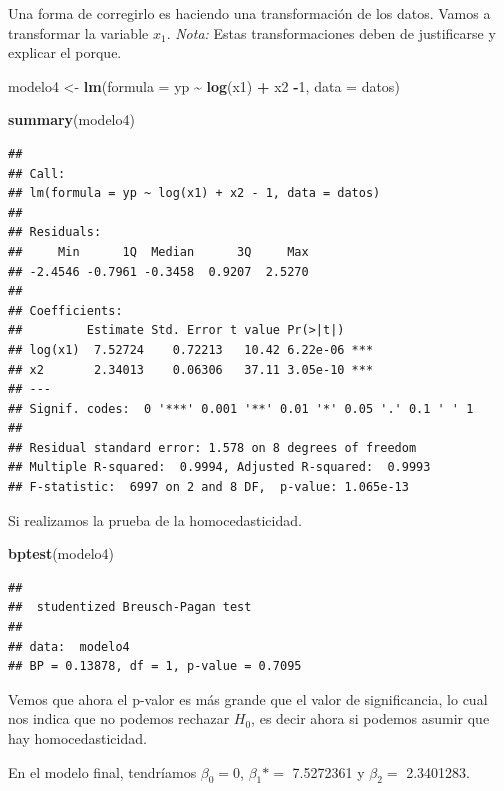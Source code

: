 \documentclass[
]{book}
\newenvironment{Shaded}{\begin{snugshade}}{\end{snugshade}}
\newcommand{\AttributeTok}[1]{\textcolor[rgb]{0.13,0.29,0.53}{#1}}
\newcommand{\DecValTok}[1]{\textcolor[rgb]{0.00,0.00,0.81}{#1}}
\newcommand{\FunctionTok}[1]{\textcolor[rgb]{0.13,0.29,0.53}{\textbf{#1}}}
\newcommand{\NormalTok}[1]{#1}
\newcommand{\OtherTok}[1]{\textcolor[rgb]{0.56,0.35,0.01}{#1}}
\newcommand{\SpecialCharTok}[1]{\textcolor[rgb]{0.81,0.36,0.00}{\textbf{#1}}}
\begin{document}
Una forma de corregirlo es haciendo una transformación de los datos. Vamos a transformar la variable \(x_1\).
\emph{Nota:} Estas transformaciones deben de justificarse y explicar el porque.

\begin{Shaded}
\begin{Highlighting}[]
\NormalTok{modelo4 }\OtherTok{\textless{}{-}} \FunctionTok{lm}\NormalTok{(}\AttributeTok{formula =}\NormalTok{ yp }\SpecialCharTok{\textasciitilde{}} \FunctionTok{log}\NormalTok{(x1) }\SpecialCharTok{+}\NormalTok{ x2 }\SpecialCharTok{{-}}\DecValTok{1}\NormalTok{, }\AttributeTok{data =}\NormalTok{ datos)}

\FunctionTok{summary}\NormalTok{(modelo4)}
\end{Highlighting}
\end{Shaded}

\begin{verbatim}
## 
## Call:
## lm(formula = yp ~ log(x1) + x2 - 1, data = datos)
## 
## Residuals:
##     Min      1Q  Median      3Q     Max 
## -2.4546 -0.7961 -0.3458  0.9207  2.5270 
## 
## Coefficients:
##         Estimate Std. Error t value Pr(>|t|)    
## log(x1)  7.52724    0.72213   10.42 6.22e-06 ***
## x2       2.34013    0.06306   37.11 3.05e-10 ***
## ---
## Signif. codes:  0 '***' 0.001 '**' 0.01 '*' 0.05 '.' 0.1 ' ' 1
## 
## Residual standard error: 1.578 on 8 degrees of freedom
## Multiple R-squared:  0.9994, Adjusted R-squared:  0.9993 
## F-statistic:  6997 on 2 and 8 DF,  p-value: 1.065e-13
\end{verbatim}

Si realizamos la prueba de la homocedasticidad.

\begin{Shaded}
\begin{Highlighting}[]
\FunctionTok{bptest}\NormalTok{(modelo4)}
\end{Highlighting}
\end{Shaded}

\begin{verbatim}
## 
##  studentized Breusch-Pagan test
## 
## data:  modelo4
## BP = 0.13878, df = 1, p-value = 0.7095
\end{verbatim}

Vemos que ahora el p-valor es más grande que el valor de significancia, lo cual nos indica que no podemos rechazar \(H_0\), es decir ahora si podemos asumir que hay homocedasticidad.

En el modelo final, tendríamos \(\beta_0=0\), \(\beta_1*=\) 7.5272361 y \(\beta_2=\) 2.3401283.
\end{document}
